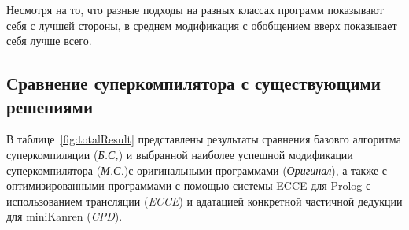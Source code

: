 Несмотря на то, что разные подходы на разных классах программ показывают
себя с лучшей стороны, в среднем модификация с обобщением вверх показывает себя
лучше всего.


\subsection{Сравнение суперкомпилятора с существующими решениями}

В таблице~\ref{fig:totalResult} представлены результаты сравнения базовго алгоритма
суперкомпиляции ({\it Б.С,}) и выбранной наиболее успешной модификации
суперкомпилятора ({\it М.С.})с оригинальными программами ({\it Оригинал}),
а также с оптимизированными программами с помощью
системы ECCE для Prolog с использованием трансляции ({\it ECCE}) и адатацией
конкретной частичной дедукции для miniKanren ({\it CPD}).

